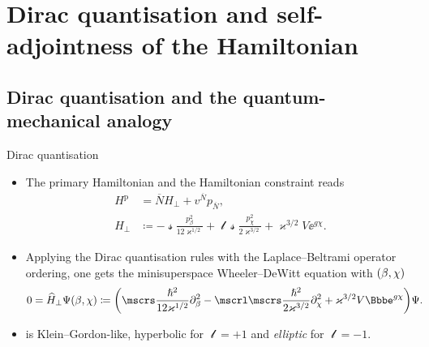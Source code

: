 \documentclass[8pt]{beamer}
\begin{document}
\section{Dirac quantisation and self-adjointness of the Hamiltonian}

\subsection{Dirac quantisation and the quantum-mechanical analogy}

\begin{frame}%
{Dirac quantisation}%
\begin{itemize}
\item
The primary Hamiltonian and the Hamiltonian
constraint reads
\begin{align}
H^\text{p} &= \overline{N}H_\perp + v^{\overline{N}} p_{\overline{N}},
\\
H_\perp &\coloneqq -\mscrs\frac{p_\beta^2}{12\varkappa^{1/2}}
+\mscrl\mscrs\frac{p_\chi^2}{2\varkappa^{3/2}}
+\varkappa^{3/2}V\ee^{g\chi}.
\end{align}
\item
Applying the Dirac quantisation rules with the Laplace--Beltrami
operator ordering, one 
gets the minisuperspace Wheeler--DeWitt equation with ${\left(\beta,\chi\right)}$
\begin{align}
0 &= \widehat{H}_\perp \rfun{\Psi}{\beta,\chi} \coloneqq
\rbr{\mscrs\frac{\hslash^2}{12\varkappa^{1/2}}\partial_{\beta}^2
-\mscrl\mscrs\frac{\hslash^2}{2\varkappa^{3/2}}\partial_{\chi}^2
+\varkappa^{3/2}V\ee^{g \chi}}\Psi.
\label{eq:WDW-10}
\end{align}
\item
{} is Klein--Gordon-like, hyperbolic for $\mscrl = +1$ and 
\emph{elliptic} for $\mscrl = -1$.
\end{itemize}
\end{frame}
\end{document}

